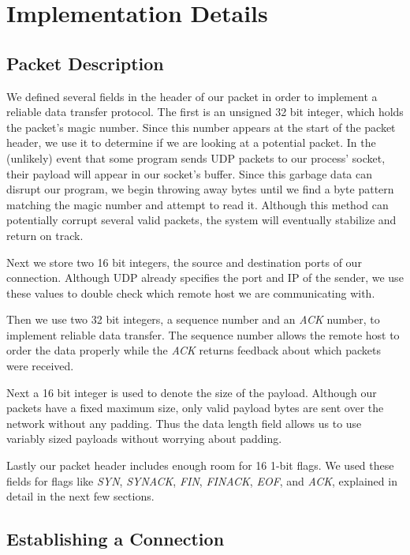 \documentclass[12pt]{article}
\begin{document}
\maketitle

\section{Implementation Details}
\subsection{Packet Description}

We defined several fields in the header of our packet in order to implement a reliable data transfer protocol. The first is an unsigned 32 bit integer, which holds the packet's magic number. Since this number appears at the start of the packet header, we use it to determine if we are looking at a potential packet. In the (unlikely) event that some program sends UDP packets to our process' socket, their payload will appear in our socket's buffer. Since this garbage data can disrupt our program, we begin throwing away bytes until we find a byte pattern matching the magic number and attempt to read it. Although this method can potentially corrupt several valid packets, the system will eventually stabilize and return on track.

Next we store two 16 bit integers, the source and destination ports of our connection. Although UDP already specifies the port and IP of the sender, we use these values to double check which remote host we are communicating with.

Then we use two 32 bit integers, a sequence number and an \emph{ACK} number, to implement reliable data transfer. The sequence number allows the remote host to order the data properly while the \emph{ACK} returns feedback about which packets were received.

Next a 16 bit integer is used to denote the size of the payload. Although our packets have a fixed maximum size, only valid payload bytes are sent over the network without any padding. Thus the data length field allows us to use variably sized payloads without worrying about padding.

Lastly our packet header includes enough room for 16 1-bit flags. We used these fields for flags like \emph{SYN}, \emph{SYNACK}, \emph{FIN}, \emph{FINACK}, \emph{EOF}, and \emph{ACK}, explained in detail in the next few sections.

\subsection{Establishing a Connection}
\end{document}
